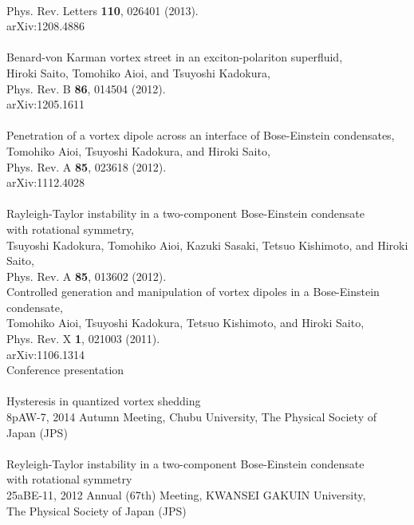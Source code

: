 \documentclass[12pt,a4paper]{jbook}
\begin{document}
		\\
		Phys. Rev. Letters {\bf 110}, 026401 (2013).
		\\
		arXiv:1208.4886
		\\
		\\
		Benard-von Karman vortex street in an exciton-polariton superfluid,
		\\
		Hiroki Saito, Tomohiko Aioi, and Tsuyoshi Kadokura,
		\\
		Phys. Rev. B {\bf 86}, 014504 (2012).
		\\
		arXiv:1205.1611
		\\
		\\
		Penetration of a vortex dipole across an interface of Bose-Einstein condensates,
		\\
		Tomohiko Aioi, Tsuyoshi Kadokura, and Hiroki Saito,
		\\
		Phys. Rev. A {\bf 85}, 023618 (2012).
		\\
		arXiv:1112.4028
		\\
		\\
		Rayleigh-Taylor instability in a two-component Bose-Einstein condensate
		\\
		with rotational symmetry,
		\\
		Tsuyoshi Kadokura, Tomohiko Aioi, Kazuki Sasaki, Tetsuo Kishimoto, and Hiroki Saito,
		\\
		Phys. Rev. A {\bf 85}, 013602 (2012).
		\\
		Controlled generation and manipulation of vortex dipoles in a Bose-Einstein condensate,
		\\
		Tomohiko Aioi, Tsuyoshi Kadokura, Tetsuo Kishimoto, and Hiroki Saito,
		\\
		Phys. Rev. X {\bf 1}, 021003 (2011).
		\\
		arXiv:1106.1314
		\newpage
		\
		\\
		Conference presentation
		\\
		\\
		Hysteresis in quantized vortex shedding
		\\
		8pAW-7, 2014 Autumn Meeting, Chubu University, The Physical Society of Japan (JPS)
		\\
		\\
		Reyleigh-Taylor instability in a two-component Bose-Einstein condensate
		\\
		with rotational symmetry
		\\
		25aBE-11, 2012 Annual (67th) Meeting, KWANSEI GAKUIN University,
		\\
		The Physical Society of Japan (JPS)
	\fi

\end{document}
